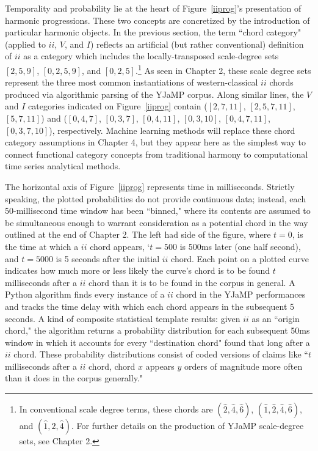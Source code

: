 Temporality and probability lie at the heart of Figure~\ref{iiprog}'s presentation of harmonic progressions.  These two concepts are concretized by the introduction of particular harmonic objects.  In the previous section, the term ``chord category" (applied to $ii$, $V$, and $I$) reflects an artificial (but rather conventional) definition of $ii$ as a category which includes the locally-transposed scale-degree sets $[2,5,9]$, $[0,2,5,9]$, and $[0,2,5]$.\footnote{In conventional scale degree terms, these chords are $(\hat{2},\hat{4},\hat{6})$, $(\hat{1},\hat{2},\hat{4}, \hat{6})$, and $(\hat{1},\hat{2},\hat{4})$.  For further details on the production of YJaMP scale-degree sets, see Chapter 2.}  As seen in Chapter 2, these scale degree sets represent the three most common instantiations of western-classical $ii$ chords produced via algorithmic parsing of the YJaMP corpus.  Along similar lines, the $V$ and $I$ categories indicated on Figure~\ref{iiprog} contain ($[2,7,11]$, $[2,5,7,11]$, $[5,7,11]$) and ($[0,4,7]$, $[0,3,7]$, $[0,4,11]$, $[0,3,10]$, $[0,4,7,11]$, $[0,3,7,10]$), respectively.  Machine learning methods will replace these chord category assumptions in Chapter 4, but they appear here as the simplest way to connect functional category concepts from traditional harmony to computational time series analytical methods.

The horizontal axis of Figure~\ref{iiprog} represents time in milliseconds.  Strictly speaking, the plotted probabilities do not provide continuous data; instead, each 50-millisecond time window has been ``binned," where its contents are assumed to be simultaneous enough to warrant consideration as a potential chord in the way outlined at the end of Chapter 2.  The left had side of the figure, where $t=0$, is the time at which a $ii$ chord appears, `$t=500$ is 500ms later (one half second), and $t=5000$ is 5 seconds after the initial $ii$ chord.  Each point on a plotted curve indicates how much more or less likely the curve's chord is to be found $t$ milliseconds after a $ii$ chord than it is to be found in the corpus in general.  A Python algorithm finds every instance of a $ii$ chord in the YJaMP performances and tracks the time delay with which each chord appears in the subsequent 5 seconds.  A kind of composite statistical template results: given $ii$ as an ``origin chord," the algorithm returns a probability distribution for each subsequent 50ms window in which it accounts for every ``destination chord" found that long after a $ii$ chord.  These probability distributions consist of coded versions of claims like ``$t$ milliseconds after a $ii$ chord, chord $x$ appears $y$ orders of magnitude more often than it does in the corpus generally."  

